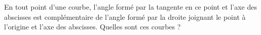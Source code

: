 \begin{exercice}\label{exoEquaDiff0016}

En tout point d'une courbe, l'angle formé par la tangente en ce point et l'axe des abscisses est complémentaire de l'angle formé par la droite joignant le point à l'origine et l'axe des abscisses. Quelles sont ces courbes ?

\end{exercice}
